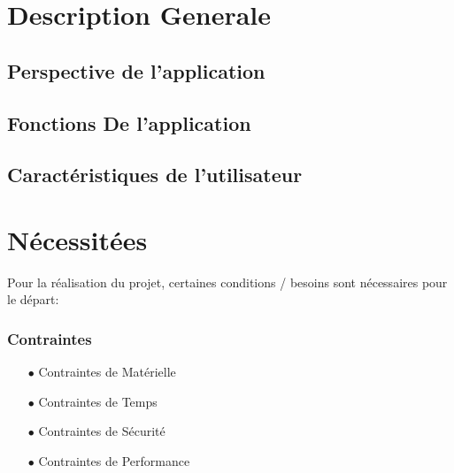 \section{Description Generale}

\subsection{Perspective de l'application}

\subsection{Fonctions De l'application}

\subsection{Caractéristiques de l'utilisateur}

\section{Nécessitées}
Pour la réalisation du projet, certaines conditions / besoins sont nécessaires
pour le départ:

\subsubsection{\large{Contraintes}}
\begin{itemize}
    \item[$\bullet$] Contraintes de Matérielle
    \item[$\bullet$] Contraintes de Temps
    \item[$\bullet$] Contraintes de Sécurité
    \item[$\bullet$] Contraintes de Performance
\end{itemize}